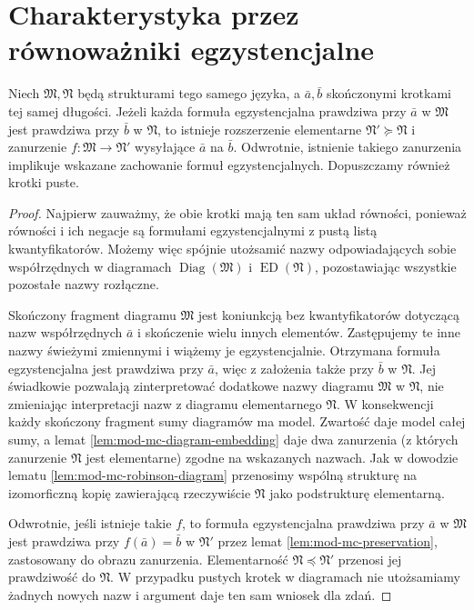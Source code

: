 \section{Charakterystyka przez równoważniki egzystencjalne}
\begin{lemat}
\label{lem:mod-mc-existential-type}
Niech $\mathfrak M,\mathfrak N$ będą strukturami
tego samego języka, a $\bar a,\bar b$ skończonymi
krotkami tej samej długości.
Jeżeli każda formuła egzystencjalna prawdziwa przy
$\bar a$ w $\mathfrak M$ jest prawdziwa przy $\bar b$
w $\mathfrak N$, to istnieje rozszerzenie elementarne
$\mathfrak N'\succeq\mathfrak N$ i zanurzenie
$f:\mathfrak M\to\mathfrak N'$ wysyłające $\bar a$
na $\bar b$. Odwrotnie, istnienie takiego zanurzenia
implikuje wskazane zachowanie formuł egzystencjalnych.
Dopuszczamy również krotki puste.
\end{lemat}
\begin{proof}
Najpierw zauważmy, że obie krotki mają ten sam układ
równości, ponieważ równości i ich negacje są formułami
egzystencjalnymi z pustą listą kwantyfikatorów.
Możemy więc spójnie utożsamić nazwy odpowiadających
sobie współrzędnych w diagramach
$\operatorname{Diag}(\mathfrak M)$ i
$\operatorname{ED}(\mathfrak N)$, pozostawiając wszystkie
pozostałe nazwy rozłączne.

Skończony fragment diagramu $\mathfrak M$ jest
koniunkcją bez kwantyfikatorów dotyczącą nazw
współrzędnych $\bar a$ i skończenie wielu innych
elementów. Zastępujemy te inne nazwy świeżymi zmiennymi
i wiążemy je egzystencjalnie. Otrzymana formuła
egzystencjalna jest prawdziwa przy $\bar a$,
więc z założenia także przy $\bar b$ w $\mathfrak N$.
Jej świadkowie pozwalają zinterpretować dodatkowe
nazwy diagramu $\mathfrak M$ w $\mathfrak N$,
nie zmieniając interpretacji nazw z diagramu
elementarnego $\mathfrak N$.
W konsekwencji każdy skończony fragment sumy diagramów
ma model. Zwartość daje model całej sumy, a lemat
\ref{lem:mod-mc-diagram-embedding} daje dwa zanurzenia
(z których zanurzenie $\mathfrak N$ jest elementarne)
zgodne na wskazanych nazwach.
Jak w dowodzie lematu \ref{lem:mod-mc-robinson-diagram}
przenosimy wspólną strukturę na izomorficzną kopię
zawierającą rzeczywiście $\mathfrak N$ jako podstrukturę
elementarną.

Odwrotnie, jeśli istnieje takie $f$, to formuła
egzystencjalna prawdziwa przy $\bar a$ w $\mathfrak M$
jest prawdziwa przy $f(\bar a)=\bar b$ w $\mathfrak N'$
przez lemat \ref{lem:mod-mc-preservation}, zastosowany
do obrazu zanurzenia. Elementarność
$\mathfrak N\preccurlyeq\mathfrak N'$ przenosi jej
prawdziwość do $\mathfrak N$. W przypadku pustych
krotek w diagramach nie utożsamiamy żadnych nowych
nazw i argument daje ten sam wniosek dla zdań.
\end{proof}

